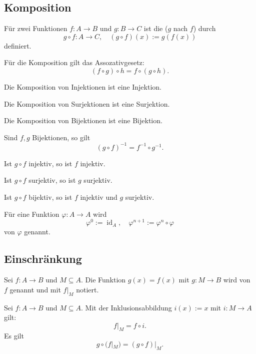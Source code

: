 \subsection{Komposition}
\begin{definition}[Komposition]
Für zwei Funktionen $f\colon A\to B$
und $g\colon B\to C$ ist die 
($g$ nach $f$)
durch
\begin{equation}\label{eq:composition}
g\circ f\colon A\to C,\quad (g\circ f)(x) := g(f(x))
\end{equation}
definiert.
\end{definition}
Für die Komposition gilt das Assozativgesetz:
\begin{equation}
(f\circ g)\circ h = f\circ(g\circ h).
\end{equation}

Die Komposition von Injektionen ist eine Injektion.

Die Komposition von Surjektionen ist eine Surjektion.

Die Komposition von Bijektionen ist eine Bijektion.

Sind $f,g$ Bijektionen, so gilt
\begin{equation}
(g\circ f)^{-1} = f^{-1}\circ g^{-1}.
\end{equation}

Ist $g\circ f$ injektiv, so ist $f$ injektiv.

Ist $g\circ f$ surjektiv, so ist $g$ surjektiv.

Ist $g\circ f$ bijektiv, so ist $f$ injektiv und $g$ surjektiv.

\begin{definition}[Iteration]
Für eine Funktion $\varphi\colon A\to A$ wird
\begin{equation}
\varphi^0:=\operatorname{id}_A,\quad \varphi^{n+1}:=\varphi^n\circ\varphi
\end{equation}
 von $\varphi$ genannt.
\end{definition}

\subsection{Einschränkung}
\begin{definition}[Einschränkung]
Sei $f\colon A\to B$ und $M\subseteq A$.
Die Funktion $g(x)=f(x)$ mit $g\colon M\to B$ wird 
von $f$ genannt und mit $f|_M$ notiert.
\end{definition}
Sei $f\colon A\to B$ und $M\subseteq A$.
Mit der Inklusionsabbildung $i(x):=x$ mit $i\colon M\to A$ gilt:
\begin{equation}
f|_M = f\circ i.
\end{equation}
Es gilt
\begin{equation}
g\circ (f|_M) = (g\circ f)|_M.
\end{equation}

